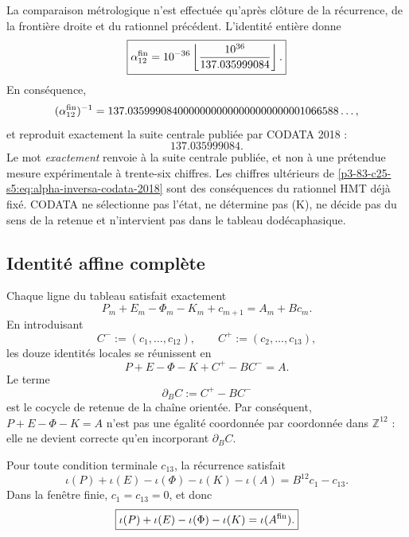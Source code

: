 La comparaison métrologique n’est effectuée qu’après clôture de la récurrence,
de la frontière droite et du rationnel précédent. L’identité entière donne
\begin{equation}
 \boxed{
 \alpha_{12}^{\rm fin}
 =10^{-36}
 \left\lfloor\frac{10^{36}}{137.035999084}\right\rfloor.}
 \label{p3-83-c25-s5:eq:alpha-finita-codata-2018}
\end{equation}
En conséquence,
\begin{equation}
 (\alpha_{12}^{\rm fin})^{-1}
 =137.03599908400000000000000000000001066588\ldots,
 \label{p3-83-c25-s5:eq:alpha-inversa-codata-2018}
\end{equation}
et reproduit exactement la suite centrale publiée par CODATA 2018
\cite{Tiesinga2021CODATA} :
\[
 \boxed{137.035999084.}
\]
Le mot \emph{exactement} renvoie à la suite centrale publiée, et non
à une prétendue mesure expérimentale à trente-six chiffres. Les chiffres
ultérieurs de \eqref{p3-83-c25-s5:eq:alpha-inversa-codata-2018} sont des conséquences du
rationnel HMT déjà fixé. CODATA ne sélectionne pas l’état, ne détermine pas (K),
ne décide pas du sens de la retenue et n’intervient pas dans le tableau dodécaphasique.

\subsection{Identité affine complète}

Chaque ligne du tableau satisfait exactement
\begin{equation}
 P_m+E_m-\Phi_m-K_m+c_{m+1}
 =A_m+Bc_m.
 \label{p3-83-c25-s5:eq:identidad-local-acarreo-alpha}
\end{equation}
En introduisant
\[
 C^-:=(c_1,\ldots,c_{12}),
 \qquad
 C^+:=(c_2,\ldots,c_{13}),
\]
les douze identités locales se réunissent en
\begin{equation}
 \boxed{
 P+E-\Phi-K+C^+-BC^-=A.}
 \label{p3-83-c25-s5:eq:identidad-afin-vectorial-alpha}
\end{equation}
Le terme
\[
 \partial_BC:=C^+-BC^-
\]
est le cocycle de retenue de la chaîne orientée. Par conséquent,
\(P+E-\Phi-K=A\) n’est pas une égalité coordonnée par coordonnée dans
\(\mathbb Z^{12}\) : elle ne devient correcte qu’en incorporant
\(\partial_BC\).

\begin{theorem}
\label{p3-83-c25-s5:thm:telescopado-acarreos-alpha}
Pour toute condition terminale \(c_{13}\), la récurrence satisfait
\begin{equation}
 \boxed{
 \iota(P)+\iota(E)-\iota(\Phi)-\iota(K)-\iota(A)
 =B^{12}c_1-c_{13}.}
 \label{p3-83-c25-s5:eq:telescopado-general-alpha}
\end{equation}
Dans la fenêtre finie, \(c_1=c_{13}=0\), et donc
\begin{equation}
 \boxed{
 \iota(P)+\iota(E)-\iota(\Phi)-\iota(K)
 =\iota(A^{\rm fin}).}
 \label{p3-83-c25-s5:eq:identidad-entera-alpha-finita}
\end{equation}
\end{theorem}

